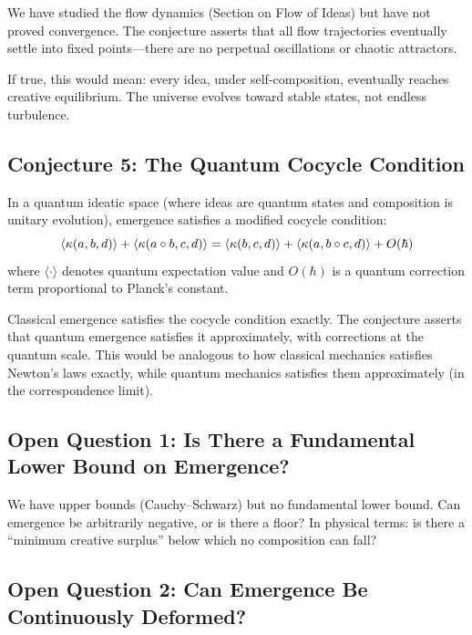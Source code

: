 We have studied the flow dynamics (Section on Flow of Ideas) but have not
proved convergence. The conjecture asserts that all flow trajectories eventually
settle into fixed points---there are no perpetual oscillations or chaotic
attractors.

If true, this would mean: every idea, under self-composition, eventually
reaches creative equilibrium. The universe evolves toward stable states, not
endless turbulence.

\subsection{Conjecture 5: The Quantum Cocycle Condition}

\begin{conjecture}
\label{conj:quantum-cocycle}
In a quantum ideatic space (where ideas are quantum states and composition is
unitary evolution), emergence satisfies a modified cocycle condition:
\[
  \langle \kappa(a, b, d) \rangle + \langle \kappa(a \circ b, c, d) \rangle
  = \langle \kappa(b, c, d) \rangle + \langle \kappa(a, b \circ c, d) \rangle + O(\hbar)
\]
where $\langle \cdot \rangle$ denotes quantum expectation value and $O(\hbar)$
is a quantum correction term proportional to Planck's constant.
\end{conjecture}

Classical emergence satisfies the cocycle condition exactly. The conjecture
asserts that quantum emergence satisfies it approximately, with corrections
at the quantum scale. This would be analogous to how classical mechanics
satisfies Newton's laws exactly, while quantum mechanics satisfies them
approximately (in the correspondence limit).

\subsection{Open Question 1: Is There a Fundamental Lower Bound on Emergence?}

We have upper bounds (Cauchy--Schwarz) but no fundamental lower bound. Can
emergence be arbitrarily negative, or is there a floor? In physical terms: is
there a ``minimum creative surplus'' below which no composition can fall?

\subsection{Open Question 2: Can Emergence Be Continuously Deformed?}

